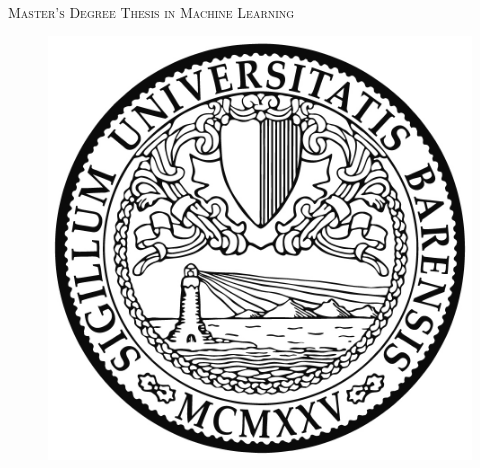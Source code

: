 \documentclass[
12pt, %
oneside, %
english, %
singlespacing, %
headsepline, %
]{MastersDoctoralThesis} %
\author{Marco \textsc{Iannotta}} %
\theoremstyle{definition}
\begin{document}
\frontmatter %

\pagestyle{plain} %


\begin{titlepage}
\begin{center}

{\scshape\LARGE \univname\par}%
\Large\deptname\\%
\textsc{\Large Master's Degree Thesis in Machine Learning}\\ [1.0cm] %

\begin{figure}[H]
\centering
\includegraphics[scale=0.85]{Figures/unibalogo.jpg}
\end{figure}


\HRule \\%
{\LARGE \bfseries \ttitle \\}%
\HRule \\%
 

\end{center}
\end{titlepage}
\end{document}
